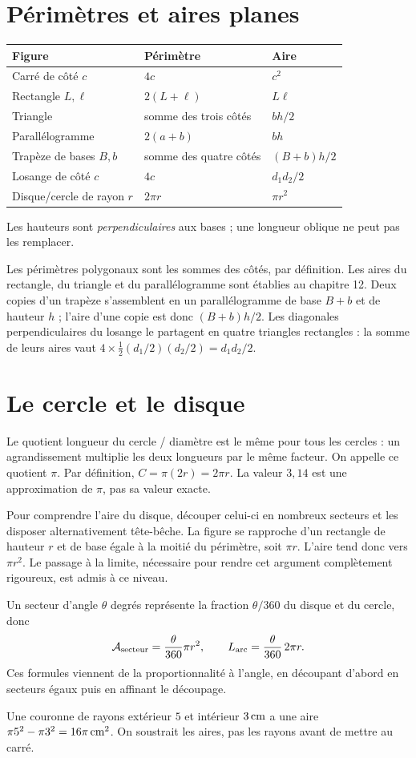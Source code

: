 \documentclass[../cours_3e.tex]{subfiles}
\begin{document}
\section{Périmètres et aires planes}
\begin{center}
\begin{tabularx}{\textwidth}{lXX}
\toprule Figure & Périmètre & Aire\\\midrule
Carré de côté $c$ & $4c$ & $c^2$\\
Rectangle $L,\ell$ & $2(L+\ell)$ & $L\ell$\\
Triangle & somme des trois côtés & $bh/2$\\
Parallélogramme & $2(a+b)$ & $bh$\\
Trapèze de bases $B,b$ & somme des quatre côtés & $(B+b)h/2$\\
Losange de côté $c$ & $4c$ & $d_1d_2/2$\\
Disque/cercle de rayon $r$ & $2\pi r$ & $\pi r^2$\\\bottomrule
\end{tabularx}
\end{center}
Les hauteurs sont \emph{perpendiculaires} aux bases ; une longueur oblique ne peut pas les remplacer.
\begin{demonstration}
Les périmètres polygonaux sont les sommes des côtés, par définition. Les aires du rectangle, du triangle et du parallélogramme sont établies au chapitre 12.
Deux copies d'un trapèze s'assemblent en un parallélogramme de base $B+b$ et de hauteur $h$ ; l'aire d'une copie est donc $(B+b)h/2$.
Les diagonales perpendiculaires du losange le partagent en quatre triangles rectangles : la somme de leurs aires vaut $4\times\frac12(d_1/2)(d_2/2)=d_1d_2/2$.
\end{demonstration}
\section{Le cercle et le disque}
Le quotient longueur du cercle / diamètre est le même pour tous les cercles : un agrandissement multiplie les deux longueurs par le même facteur. On appelle ce quotient $\pi$. Par définition, $C=\pi(2r)=2\pi r$. La valeur $3{,}14$ est une approximation de $\pi$, pas sa valeur exacte.
\begin{justification}
Pour comprendre l'aire du disque, découper celui-ci en nombreux secteurs et les disposer alternativement tête-bêche. La figure se rapproche d'un rectangle de hauteur $r$ et de base égale à la moitié du périmètre, soit $\pi r$. L'aire tend donc vers $\pi r^2$. Le passage à la limite, nécessaire pour rendre cet argument complètement rigoureux, est admis à ce niveau.
\end{justification}
Un secteur d'angle $\theta$ degrés représente la fraction $\theta/360$ du disque et du cercle, donc
\[\mathcal{A}_{\text{secteur}}=\frac{\theta}{360}\pi r^2,\qquad
L_{\text{arc}}=\frac{\theta}{360}\,2\pi r.\]
Ces formules viennent de la proportionnalité à l'angle, en découpant d'abord en secteurs égaux puis en affinant le découpage.
\begin{exemple}
Une couronne de rayons extérieur $5$ et intérieur $3\,\mathrm{cm}$ a une aire $\pi5^2-\pi3^2=16\pi\,\mathrm{cm^2}$. On soustrait les aires, pas les rayons avant de mettre au carré.
\end{exemple}
\end{document}
